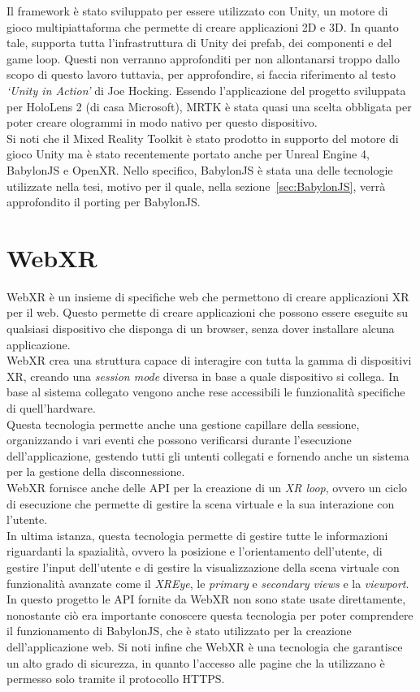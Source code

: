 Il framework è stato sviluppato per essere utilizzato con Unity, un motore di gioco multipiattaforma che permette di creare applicazioni 2D e 3D. In quanto tale, supporta tutta
l'infrastruttura di Unity dei prefab, dei componenti e del game loop. Questi non verranno approfonditi per non allontanarsi troppo dallo scopo di questo lavoro tuttavia, per 
approfondire, si faccia riferimento al testo \textit{`Unity in Action'} di Joe Hocking\cite{hocking2018}. Essendo 
l'applicazione del progetto sviluppata per HoloLens 2 (di casa Microsoft), MRTK è stata quasi una scelta obbligata per poter creare ologrammi in modo nativo per questo dispositivo.\\
Si noti che il Mixed Reality Toolkit è stato prodotto in supporto del motore di gioco Unity ma è stato recentemente portato anche per Unreal Engine 4, BabylonJS e OpenXR. Nello 
specifico, BabylonJS è stata una delle tecnologie utilizzate nella tesi, motivo per il quale, nella sezione~\ref{sec:BabylonJS}, verrà approfondito il porting per BabylonJS.

\section{WebXR}\label{sec:WebXR}
WebXR è un insieme di specifiche web che permettono di creare applicazioni XR per il web. Questo permette di creare applicazioni che possono essere eseguite su qualsiasi dispositivo
che disponga di un browser, senza dover installare alcuna applicazione\cite{WebXR}.\\
WebXR crea una struttura capace di interagire con tutta la gamma di dispositivi XR, creando una \textit{session mode} diversa in base a quale dispositivo si collega. 
In base al sistema collegato vengono anche rese accessibili le funzionalità specifiche di quell'hardware.\\
Questa tecnologia permette anche una gestione capillare della sessione, organizzando i vari eventi che possono verificarsi durante l'esecuzione dell'applicazione, gestendo tutti
gli untenti collegati e fornendo anche un sistema per la gestione della disconnessione.\\
WebXR fornisce anche delle API per la creazione di un \textit{XR loop}, ovvero un ciclo di esecuzione che permette di gestire la scena virtuale e la sua interazione con l'utente.\\
In ultima istanza, questa tecnologia permette di gestire tutte le informazioni riguardanti la spazialità, ovvero la posizione e l'orientamento dell'utente, di gestire l'input 
dell'utente e di gestire la visualizzazione della scena virtuale con funzionalità avanzate come il \textit{XREye}, le \textit{primary} e \textit{secondary views} e la \textit{viewport}.
\newline \newline
In questo progetto le API fornite da WebXR non sono state usate direttamente, nonostante ciò era importante conoscere questa tecnologia per poter comprendere il funzionamento
di BabylonJS, che è stato utilizzato per la creazione dell'applicazione web. Si noti infine che WebXR è una tecnologia che garantisce un alto grado di sicurezza, in quanto
l'accesso alle pagine che la utilizzano è permesso solo tramite il protocollo HTTPS.

